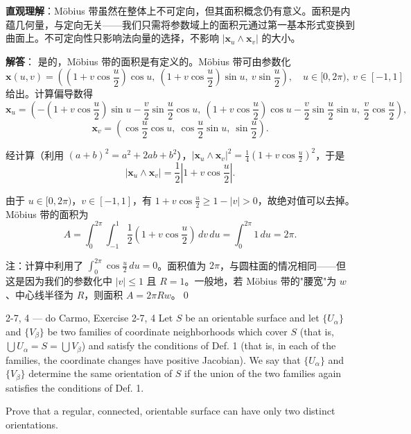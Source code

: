 \begin{solution}
\textbf{直观理解}：Möbius 带虽然在整体上不可定向，但其面积概念仍有意义。面积是内蕴几何量，与定向无关——我们只需将参数域上的面积元通过第一基本形式变换到曲面上。不可定向性只影响法向量的选择，不影响 $|\mathbf{x}_u \wedge \mathbf{x}_v|$ 的大小。

\textbf{解答}：
是的，Möbius 带的面积是有定义的。Möbius 带可由参数化
\[
\mathbf{x}(u, v) = \left(\left(1 + v \cos\frac{u}{2}\right)\cos u,\ \left(1 + v \cos\frac{u}{2}\right)\sin u,\ v \sin\frac{u}{2}\right),
\quad u \in [0, 2\pi),\ v \in [-1, 1]
\]
给出。计算偏导数得
\[
\mathbf{x}_u = \left(-\left(1 + v\cos\frac{u}{2}\right)\sin u - \frac{v}{2}\sin\frac{u}{2}\cos u,\ \left(1 + v\cos\frac{u}{2}\right)\cos u - \frac{v}{2}\sin\frac{u}{2}\sin u,\ \frac{v}{2}\cos\frac{u}{2}\right),
\]
\[
\mathbf{x}_v = \left(\cos\frac{u}{2}\cos u,\ \cos\frac{u}{2}\sin u,\ \sin\frac{u}{2}\right).
\]

经计算（利用 $(a+b)^2 = a^2 + 2ab + b^2$），$|\mathbf{x}_u \wedge \mathbf{x}_v|^2 = \frac{1}{4}(1 + v\cos\frac{u}{2})^2$，于是
\[
|\mathbf{x}_u \wedge \mathbf{x}_v| = \frac{1}{2}\left|1 + v\cos\frac{u}{2}\right|.
\]

由于 $u \in [0, 2\pi)$，$v \in [-1, 1]$，有 $1 + v\cos\frac{u}{2} \geq 1 - |v| > 0$，故绝对值可以去掉。Möbius 带的面积为
\[
A = \int_0^{2\pi}\int_{-1}^{1} \frac{1}{2}\left(1 + v\cos\frac{u}{2}\right)\,dv\,du
= \int_0^{2\pi} 1\,du = 2\pi.
\]

注：计算中利用了 $\int_0^{2\pi}\cos\frac{u}{2}\,du = 0$。面积值为 $2\pi$，与圆柱面的情况相同——但这是因为我们的参数化中 $|v| \leq 1$ 且 $R = 1$。一般地，若 Möbius 带的"腰宽"为 $w$、中心线半径为 $R$，则面积 $A = 2\pi R w$。\qed
\end{solution}

\begin{exercise}{2-7, 4 — do Carmo, Exercise 2-7, 4}
Let $S$ be an orientable surface and let $\{U_\alpha\}$ and $\{V_\beta\}$ be two families of coordinate neighborhoods which cover $S$ (that is, $\bigcup U_\alpha = S = \bigcup V_\beta$) and satisfy the conditions of Def. 1 (that is, in each of the families, the coordinate changes have positive Jacobian). We say that $\{U_\alpha\}$ and $\{V_\beta\}$ determine the same orientation of $S$ if the union of the two families again satisfies the conditions of Def. 1.

Prove that a regular, connected, orientable surface can have only two distinct orientations.
\end{exercise}

